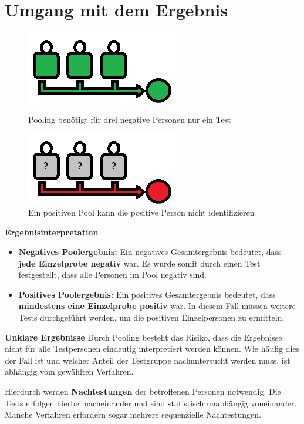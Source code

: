 \section{Umgang mit dem Ergebnis}
\begin{figure}
	\includegraphics[width=.4\textwidth]{img/PoolAlleNegativ}
	\caption{Pooling benötigt für drei negative Personen nur ein Test\footnotemark}
	\includegraphics[width=.4\textwidth]{img/PoolPositiv}
	\caption{Ein positiven Pool kann die positive Person nicht identifizieren\footnotemark}
\end{figure}
\textbf{Ergebnisinterpretation}
\begin{itemize}
	\item \textbf{Negatives Poolergebnis:}\newline
	Ein negatives Gesamtergebnis bedeutet, dass \textbf{jede Einzelprobe negativ} war.
	Es wurde somit durch einen Test festgestellt, dass alle Personen im Pool negativ sind.
		
	\item \textbf{Positives Poolergebnis:}\newline
	Ein positives Gesamtergebnis bedeutet, dass \textbf{mindestens eine Einzelprobe positiv} war.
	In diesem Fall müssen weitere Tests durchgeführt werden, um die positiven Einzelpersonen zu ermitteln.
\end{itemize}

\textbf{Unklare Ergebnisse}\newline
Durch Pooling besteht das Risiko, dass die Ergebnisse nicht für alle Testpersonen eindeutig interpretiert werden können.
Wie häufig dies der Fall ist und welcher Anteil der Testgruppe nachuntersucht werden muss, ist abhängig vom gewählten Verfahren.

Hierdurch werden \textbf{Nachtestungen} der betroffenen Personen notwendig.
Die Tests erfolgen hierbei nacheinander und sind statistisch unabhängig voneinander.
Manche Verfahren erfordern sogar mehrere sequenzielle Nachtestungen.

